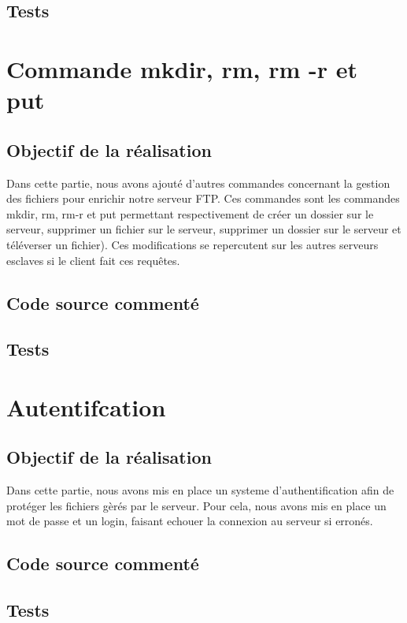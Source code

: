 \documentclass{report}
\begin{document}
      \section{Tests}

    \chapter{Commande mkdir, rm, rm -r et put}
      \section{Objectif de la r\'ealisation}
	Dans cette partie, nous avons ajout\'e d'autres commandes concernant la gestion des fichiers pour enrichir notre serveur FTP. Ces commandes sont les commandes mkdir, rm, rm-r et put permettant respectivement de cr\'eer un dossier sur le serveur, supprimer un fichier sur le serveur, supprimer un dossier sur le serveur et t\'el\'everser un fichier). Ces modifications se repercutent sur les autres serveurs esclaves si le client fait ces requ\^etes.
      \section{Code source comment\'e}
      \section{Tests}

    \chapter{Autentifcation}
      \section{Objectif de la r\'ealisation}
	Dans cette partie, nous avons mis en place un systeme d'authentification afin de prot\'eger les fichiers g\`er\'es par le serveur. Pour cela, nous avons mis en place un mot de passe et un login, faisant echouer la connexion au serveur si erron\'es.
      \section{Code source comment\'e}
      \section{Tests}
\end{document}
